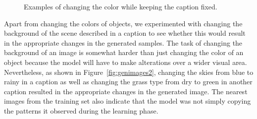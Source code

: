 \documentclass{article} %
\begin{document}
\begin{figure}[!h]
 \vspace{-0.5cm}
\captionsetup[subfigure]{labelformat=empty}
\begin{center}
\quad
%
\quad
%
\quad
%
\quad
%
\end{center}
\caption{Examples of changing the color while keeping the caption fixed.}
\label{fig:genimages1}
\vspace{-0.6cm}
\end{figure}

Apart from changing the colors of objects, we experimented with changing the background of the scene described in a caption to see whether this would result in the appropriate changes in the generated samples. The task of changing the background of an image is somewhat harder than just changing the color of an object because the model will have to make alterations over a wider visual area. Nevertheless, as shown in Figure~\ref{fig:genimages2}, changing the skies from blue to rainy in a caption as well as changing the grass type from dry to green in another caption resulted in the appropriate changes in the generated image. The nearest images from the training set also indicate that the model was not simply copying the patterns it observed during the learning phase.
\end{document}
